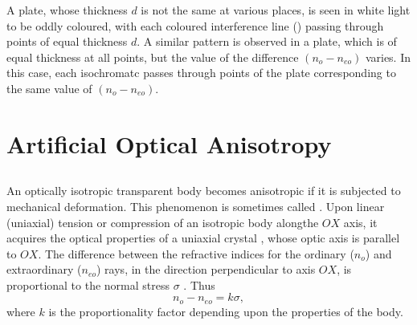 A plate, whose thickness $d$ is not the same at various
places, is seen in white light to be oddly coloured, with each coloured interference line () passing through points of equal thickness $d$. A similar pattern is observed in a plate, which is of equal thickness at all points, but the value of the difference
$(n_{o} - n_{eo})$ varies. In this case, each isochromatc passes through points of the plate corresponding to the same value of $(n_{o} - n_{eo})$.

\section{ Artificial Optical Anisotropy}
\label{sec-35.4}

\subsection{}\label{35.4.1} An optically isotropic transparent body becomes anisotropic if it is subjected to mechanical deformation. This phenomenon is sometimes called . Upon linear (uniaxial) tension or compression of an isotropic body alongthe $OX$ axis, it acquires the optical properties of a uniaxial crystal , whose optic axis is parallel to $OX$. The difference between the refractive indices for the ordinary ($n_{o}$) and extraordinary ($n_{eo}$) rays, in the direction perpendicular to axis $OX$, is proportional to the normal stress $\sigma$ . Thus
\begin{equation*}%
n_{o} - n_{eo} = k \sigma,
\end{equation*}
where $k$ is the proportionality factor depending upon the properties of the body.

